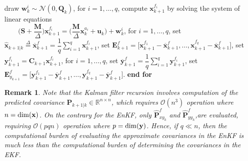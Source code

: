 \documentclass[journal]{IEEEtran}
\newcommand{\mb}{\mathbf}
\newtheorem{remark}{Remark}
\begin{document}
\begin{algorithm}[t!]
\begin{algorithmic}
\STATE\hspace{.5cm} draw $\mb{w}_{k}^{i}\sim\mathcal{N}(0,\mb{Q}_{k})$, for $i=1,\dots,q$,
\STATE\hspace{.5cm} compute $\mb{x}_{k+1}^{{f}_{i}} $ by solving the system of linear equations \\ $\quad \quad \bigg(\mb{S} + \dfrac{\mb{M}}{\Delta}\bigg) \mb{x}_{k+1}^{{f}_{i}} = \bigg( \dfrac{\mb{M}}{\Delta}\mb{x}_{k}^{{a}_{i}} + \textbf{u}_{k}\bigg)  + \mb{w}_{k}^{i}$, for $i=1,\dots,q$, %
\STATE\hspace{.5cm} set $\hat{\mb{x}}_{k+1|k} \overset{\Delta}{=} \overline{\mb{x}}_{k+1}^{f} = \dfrac{1}{q}\sum_{i=1}^{q}\mb{x}_{k+1}^{f_{i}}$,
\STATE\hspace{.5cm} set $\mb{E}_{k+1}^{f} = \big[ \textbf{x}_{k+1}^{f_{1}} - \overline{\mb{x}}_{k+1}^{f},\dots,\textbf{x}_{k+1}^{f_{q}} - \overline{\mb{x}}_{k+1}^{f} \big]$,
\STATE\hspace{.5cm} set $\mb{y}_{k+1}^{f_i} = \mb{C}_{k+1} \textbf{x}_{k+1}^{f_{i}}$, for $i=1,\dots,q$, 
\STATE\hspace{.5cm} set $\overline{\mb{y}}_{k+1}^{f} = \dfrac{1}{q}\sum_{i=1}^{q}\mb{y}_{k+1}^{f_{i}}$,
\STATE\hspace{.5cm} set $\mb{E}_{{y}_{k+1}}^{f} = \big[ \textbf{y}_{k+1}^{f_{1}} - \overline{\mb{y}}_{k+1}^{f},\dots,\textbf{y}_{k+1}^{f_{q}} - \overline{\mb{y}}_{k+1}^{f} \big]$.
\STATE \textbf{end for}
\end{algorithmic}
\end{algorithm}

\begin{remark}
Note that the Kalman filter recursion involves computation of the predicted covariance $\mb{P}_{k+1|k} \in \mathbb{R}^{n\times n}$, which requires $\mathcal{O}(n^{3})$ operation where $n = {\rm dim}(\mb{x})$. On the contrary for the EnKF,  only $\hat{\mb{P}}_{{xy}_{k}}^{f}$ and $\hat{\mb{P}}_{{yy}_{k}}^{f}$,are evaluated, requiring $\mathcal{O}(pqn)$ operation
where $p ={\rm dim} (\mb{y})$. Hence, if $q\ll n$, then the computational burden of evaluating the approximate covariances in the EnKF is much less than the computational burden of determining the  covariances in the EKF. 
\end{remark}
	
\end{document}
